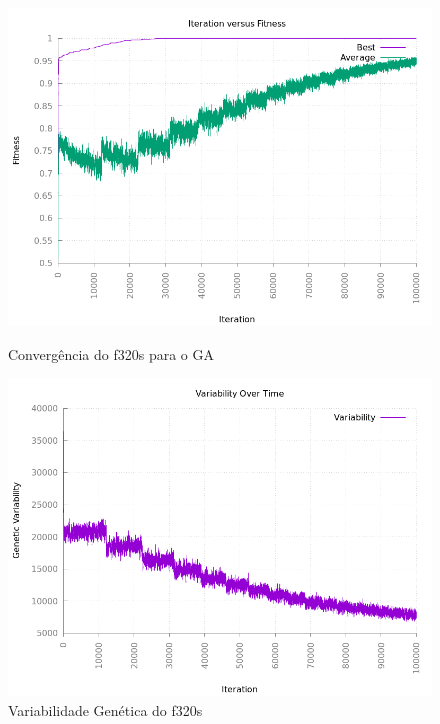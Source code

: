 \documentclass[12pt]{article}
\begin{document}
\begin{figure}[h!]
    \centering
    \begin{minipage}{0.45\textwidth}
        \centering
        \includegraphics[width=\textwidth]{pictures/f320sconvergence}
        \caption{Convergência do f320s para o GA}
    \end{minipage}
    \begin{minipage}{0.45\textwidth}
        \centering
        \includegraphics[width=\textwidth]{pictures/f320svariability}
        \caption{Variabilidade Genética do f320s}
    \end{minipage}
\end{figure}
\end{document}
